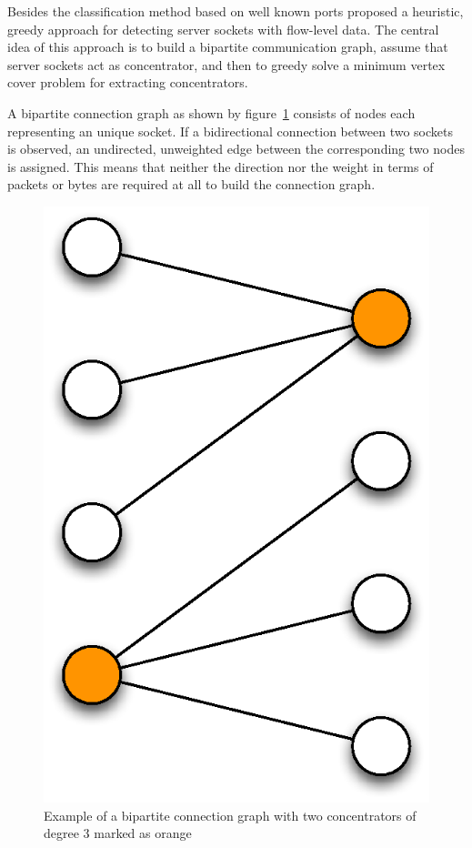 Besides the classification method based on well known ports  
\citet{Schatzmann:Mining,Schatzmann:Dissection,Schatzmann:Tracing} proposed a 
heuristic, greedy approach for detecting \glspl{server socket} with flow-level 
data. The central idea of this approach is to build a bipartite communication 
graph, assume that server sockets act as concentrator, and then to greedy solve 
a minimum vertex cover problem for extracting concentrators. 

A bipartite connection graph as shown by figure \ref{fig:bipartite_graph} 
consists of nodes each representing an unique socket. If a bidirectional 
connection between two sockets is observed, an undirected, unweighted edge 
between the corresponding two nodes is assigned. This means that neither the 
direction nor the weight in terms of packets or bytes are required at all to 
build the connection graph. 

\begin{figure}
	[h] \centering 
	\includegraphics[width=\linewidth/3]{images/connection_graph.eps} \caption{Example of a bipartite connection graph with two concentrators of degree 3 marked as orange} 
	\label{fig:bipartite_graph} 
\end{figure}

